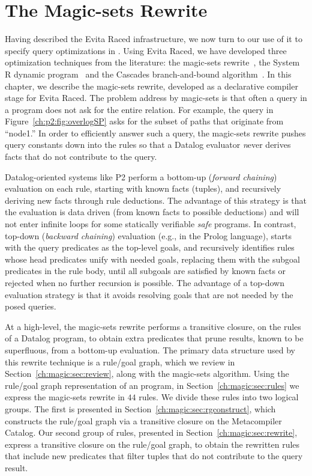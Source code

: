 \chapter[The Magic-sets Rewrite]{The Magic-sets Rewrite}
\label{ch:magic}

Having described the Evita Raced infrastructure, we now turn to our use of it
to specify query optimizations in \OVERLOG.  Using Evita Raced, we have
developed three optimization techniques from the literature: the magic-sets
rewrite~\cite{magic-sets1, magic-sets2}, the System R dynamic
program~\cite{selinger} and the Cascades branch-and-bound
algorithm~\cite{cascades}.  In this chapter, we describe the magic-sets
rewrite, developed as a declarative compiler stage for Evita Raced.  The
problem address by magic-sets is that often a query in a program does not ask
for the entire relation.  For example, the  query in
Figure~\ref{ch:p2:fig:overlogSP} asks for the subset of paths that originate
from ``node1.'' In order to efficiently answer such a query, the
magic-sets rewrite pushes query constants down into the rules so that a Datalog
evaluator {\emph never} derives facts that do not contribute to the query.

Datalog-oriented systems like P2 perform a bottom-up (\emph{forward chaining})
evaluation on each rule, starting with known facts (tuples), and recursively
deriving new facts through rule deductions.  The advantage of this strategy is
that the evaluation is data driven (from known facts to possible deductions)
and will not enter infinite loops for some statically verifiable \emph{safe}
programs.  In contrast, top-down (\emph{backward chaining}) evaluation (e.g.,
in the Prolog language), starts with the query predicates as the top-level
goals, and recursively identifies rules whose head predicates unify with needed
goals, replacing them with the subgoal predicates in the rule body, until all
subgoals are satisfied by known facts or rejected when no further recursion is
possible.  The advantage of a top-down evaluation strategy is that it avoids
resolving goals that are not needed by the posed queries.

At a high-level, the magic-sets rewrite performs a transitive closure, on the
rules of a Datalog program, to obtain extra predicates that prune results,
known to be superfluous, from a bottom-up evaluation.  The primary data
structure used by this rewrite technique is a rule/goal graph, which we review
in Section~\ref{ch:magic:sec:review}, along with the magic-sets algorithm.
Using the rule/goal graph representation of an \OVERLOG program, in
Section~\ref{ch:magic:sec:rules} we express the magic-sets rewrite in $44$ 
\OVERLOG rules.  We divide these rules into two logical groups.  The first is
presented in Section~\ref{ch:magic:sec:rgconstruct}, which constructs the
rule/goal graph via a transitive closure on the Metacompiler Catalog.  Our
second group of rules, presented in Section~\ref{ch:magic:sec:rewrite}, express
a transitive closure on the rule/goal graph, to obtain the rewritten rules that
include new predicates that filter tuples that do not contribute to the query
result.

